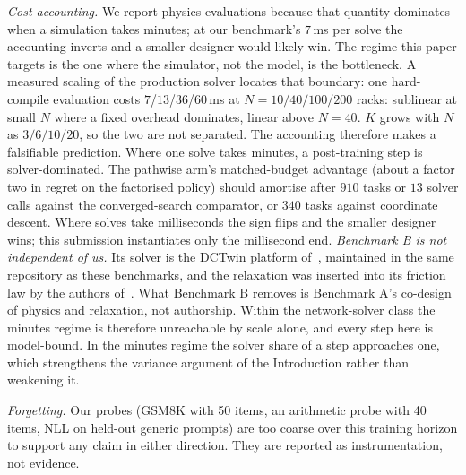 \documentclass[journal]{IEEEtran}
\newif\ifblindreview
\newcommand{\platform}{\ifblindreview a production data-centre digital-twin platform\else the DCTwin platform\fi}
\begin{document}
\emph{Cost accounting.}  We report physics evaluations because that quantity
dominates when a simulation takes minutes; at our benchmark's $7$\,ms per solve
the accounting inverts and a smaller designer would likely win.  The regime this
paper targets is the one where the simulator, not the model, is the bottleneck.
A measured scaling of the production solver locates that boundary: one
hard-compile evaluation costs $7$/$13$/$36$/$60$\,ms at $N=10/40/100/200$ racks:
sublinear at small $N$ where a fixed overhead dominates, linear above
$N=40$.  $K$ grows with $N$ as $3/6/10/20$, so the two are not separated.
The accounting therefore makes a falsifiable prediction.  Where one solve takes
minutes, a post-training step is solver-dominated. The pathwise arm's
matched-budget advantage (about a factor two in regret on the factorised policy)
should amortise after $910$ tasks or $13$ solver calls against the
converged-search comparator, or $340$ tasks against coordinate descent.  Where solves take milliseconds the sign flips and
the smaller designer wins; this submission instantiates only the millisecond end.
\emph{Benchmark B is not independent of us.}  Its solver is \platform
of~\cite{li2026dctwin}, maintained in the same repository as these benchmarks, and
the relaxation was inserted into its friction law \ifblindreview during the platform's development~\cite{li2026dctwin}\else by the authors of~\cite{li2026dctwin}\fi.  What
Benchmark B removes is Benchmark A's co-design of physics and relaxation, not
authorship.
Within the network-solver class the minutes regime is therefore unreachable by
scale alone, and every step here is model-bound.  In the minutes regime the
solver share of a step approaches one, which strengthens the variance argument
of the Introduction rather than weakening it.

\emph{Forgetting.}  Our probes (GSM8K with 50 items, an arithmetic probe with 40
items, NLL on held-out generic prompts) are too coarse over this training horizon
to support any claim in either direction. They are reported as instrumentation,
not evidence.
\end{document}
